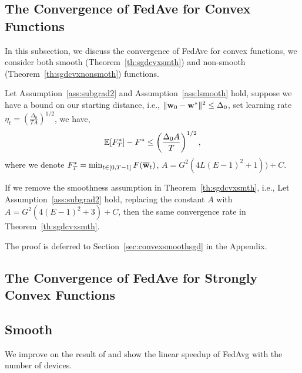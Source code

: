 \subsection{The Convergence of FedAve for Convex Functions}
In this subsection, we discuss the convergence of FedAve for convex functions,
we consider both smooth (Theorem~\ref{th:sgdcvxsmth}) and non-smooth (Theorem~\ref{th:sgdcvxnonsmoth})
functions. 

\begin{theorem}
Let Assumption~\ref{ass:subgrad2} and Assumption~\ref{ass:lsmooth} hold, suppose we have a bound 
on our starting distance, i.e., $\|{\mathbf{w}}_{0} - {\mathbf{w}}^*\|^2 \leq \Delta_0$, set learning rate $\eta_t =  \left(\frac{\Delta_0}{ T A}\right)^{1/2}$, we have,
$$\mathbb{E}[ F_T^*] - F^*  \leq \left(\frac{ \Delta_0 A }{T}\right)^{1/2},$$
where we denote $F^*_T = \min_{t \in [0, T-1]} F({\overline{\mathbf{w}}}_t)$, $A = G^2( 4L(E-1)^2 + 1)) + C$.
\label{th:sgdcvxsmth}
\end{theorem}

\begin{theorem}
If we remove the smoothness assumption in Theorem~\ref{th:sgdcvxsmth}, i.e., 
	Let Assumption~\ref{ass:subgrad2} hold, replacing the constant $A$ with $A=G^2 \left(4(E-1)^2 + 3\right) + C$, then the same convergence rate in Theorem~\ref{th:sgdcvxsmth}.
	\label{th:sgdcvxnonsmoth}
\end{theorem}
The proof is deferred to Section~\ref{sec:convexsmoothsgd} in the Appendix. 

\subsection{The Convergence of FedAve for Strongly Convex Functions}

\subsection{Smooth}
We improve on the result of \cite{li2019convergence} and show the linear speedup of FedAvg with the number of devices. 

